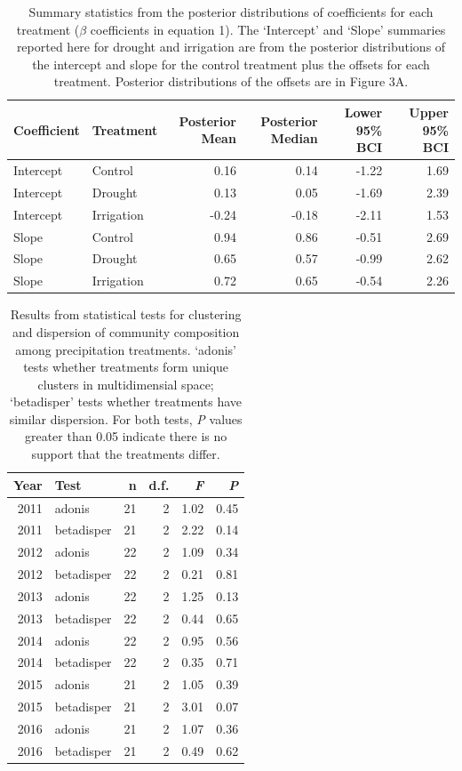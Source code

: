 \documentclass[fleqn,10pt,lineno]{wlpeerj} %
\begin{document}
\begin{table}[ht]
\centering
\caption{Summary statistics from the posterior distributions of coefficients for each treatment ($\beta$ coefficients in equation 1). The `Intercept' and `Slope' summaries reported here for drought and irrigation are from the posterior distributions of the intercept and slope for the control treatment plus the offsets for each treatment. Posterior distributions of the offsets are in Figure 3A.} 
\begingroup\normalsize
\begin{tabular}{llrrrr}
  \hline
Coefficient & Treatment & Posterior Mean & Posterior Median & Lower 95\% BCI & Upper 95\% BCI \\ 
  \hline
Intercept & Control & 0.16 & 0.14 & -1.22 & 1.69 \\ 
  Intercept & Drought & 0.13 & 0.05 & -1.69 & 2.39 \\ 
  Intercept & Irrigation & -0.24 & -0.18 & -2.11 & 1.53 \\ 
  Slope & Control & 0.94 & 0.86 & -0.51 & 2.69 \\ 
  Slope & Drought & 0.65 & 0.57 & -0.99 & 2.62 \\ 
  Slope & Irrigation & 0.72 & 0.65 & -0.54 & 2.26 \\ 
   \hline
\end{tabular}
\endgroup
\end{table}\begin{table}[ht]
\centering
\caption{Results from statistical tests for clustering and dispersion of community composition among precipitation treatments. `adonis' tests whether treatments form unique clusters in multidimensial space; `betadisper' tests whether treatments have similar dispersion. For both tests, \emph{P} values greater than 0.05 indicate there is no support that the treatments differ.} 
\begingroup\normalsize
\begin{tabular}{rlrrrr}
  \hline
Year & Test & n & d.f. & \emph{F} & \emph{P} \\ 
  \hline
2011 & adonis &  21 &   2 & 1.02 & 0.45 \\ 
  2011 & betadisper &  21 &   2 & 2.22 & 0.14 \\ 
  2012 & adonis &  22 &   2 & 1.09 & 0.34 \\ 
  2012 & betadisper &  22 &   2 & 0.21 & 0.81 \\ 
  2013 & adonis &  22 &   2 & 1.25 & 0.13 \\ 
  2013 & betadisper &  22 &   2 & 0.44 & 0.65 \\ 
  2014 & adonis &  22 &   2 & 0.95 & 0.56 \\ 
  2014 & betadisper &  22 &   2 & 0.35 & 0.71 \\ 
  2015 & adonis &  21 &   2 & 1.05 & 0.39 \\ 
  2015 & betadisper &  21 &   2 & 3.01 & 0.07 \\ 
  2016 & adonis &  21 &   2 & 1.07 & 0.36 \\ 
  2016 & betadisper &  21 &   2 & 0.49 & 0.62 \\ 
   \hline
\end{tabular}
\endgroup
\end{table}
\end{document}
